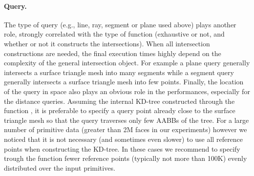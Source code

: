\paragraph{Query.} The type of query (e.g., line, ray, segment or plane used above) plays another role, strongly correlated with the type of function (exhaustive or not, and whether or not it constructs the intersections). When all intersection constructions are needed, the final execution times highly depend on the complexity of the general intersection object. For example a plane query generally intersects a surface triangle mesh into many segments while a segment query generally intersects a surface triangle mesh into few points. Finally, the location of the query in space also plays an obvious role in the performances, especially for the distance queries. Assuming the internal KD-tree constructed through the function , it is preferable to specify a query point already close to the surface triangle mesh so that the query traverses only few AABBs of the tree. For a large number of primitive data (greater than 2M faces in our experiments) however we noticed that it is not necessary (and sometimes even slower) to use all reference points when constructing the KD-tree. In these cases we recommend to specify trough the function  fewer reference points (typically not more than 100K) evenly distributed over the input primitives.


